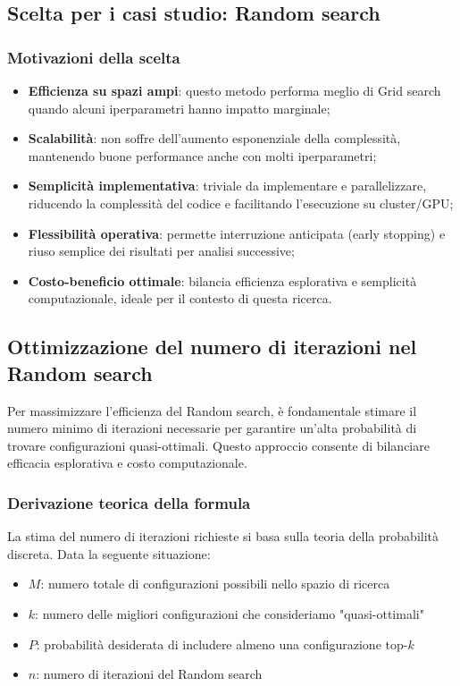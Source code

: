 \documentclass[a4paper,12pt]{report}
\begin{document}
	\subsection{Scelta per i casi studio: Random search}
	
	\subsubsection{Motivazioni della scelta}
	\begin{itemize}
		\item \textbf{Efficienza su spazi ampi}: questo metodo performa meglio di Grid search quando alcuni iperparametri hanno impatto marginale;
		\item \textbf{Scalabilità}: non soffre dell'aumento esponenziale della complessità, mantenendo buone performance anche con molti iperparametri;
		\item \textbf{Semplicità implementativa}: triviale da implementare e parallelizzare, riducendo la complessità del codice e facilitando l'esecuzione su cluster/GPU;
		\item \textbf{Flessibilità operativa}: permette interruzione anticipata (early stopping) e riuso semplice dei risultati per analisi successive;
		\item \textbf{Costo-beneficio ottimale}: bilancia efficienza esplorativa e semplicità computazionale, ideale per il contesto di questa ricerca.
	\end{itemize}
	
	\subsection{Ottimizzazione del numero di iterazioni nel Random search}
	Per massimizzare l'efficienza del Random search, è fondamentale stimare il numero minimo di iterazioni necessarie per garantire un'alta probabilità di trovare configurazioni quasi-ottimali. Questo approccio consente di bilanciare efficacia esplorativa e costo computazionale.
	
	\subsubsection{Derivazione teorica della formula}
	La stima del numero di iterazioni richieste si basa sulla teoria della probabilità discreta. Data la seguente situazione:
	\begin{itemize}
		\item $M$: numero totale di configurazioni possibili nello spazio di ricerca
		\item $k$: numero delle migliori configurazioni che consideriamo "quasi-ottimali"
		\item $P$: probabilità desiderata di includere almeno una configurazione top-$k$
		\item $n$: numero di iterazioni del Random search
	\end{itemize}
	
\end{document}
